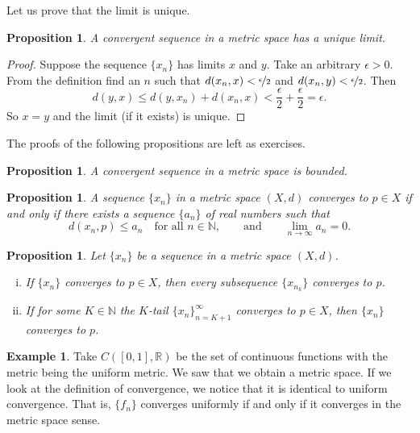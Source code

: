 \documentclass[12pt,openany]{book}
\newcommand{\R}{{\mathbb{R}}}
\newcommand{\N}{{\mathbb{N}}}
\theoremstyle{plain}
\newtheorem{prop}[thm]{Proposition}
\theoremstyle{remark}
\theoremstyle{definition}
\theoremstyle{exercise}
\theoremstyle{example}
\newtheorem{example}[thm]{Example}
\begin{document}
Let us prove that the limit is unique.  

\begin{prop} \label{prop:mslimisunique}
A convergent sequence in a metric space has a unique limit.
\end{prop}

\begin{proof}
Suppose the sequence $\{ x_n \}$ has limits $x$ and $y$.
Take an arbitrary $\epsilon > 0$.
From the definition find an $n$ such that 
$d(x_n,x) < \nicefrac{\epsilon}{2}$ and
$d(x_n,y) < \nicefrac{\epsilon}{2}$.  Then
\begin{equation*}
d(y,x)
\leq
d(y,x_n) + d(x_n,x)
<
\frac{\epsilon}{2} + \frac{\epsilon}{2} = \epsilon .
\end{equation*}
So $x=y$ and the limit (if it exists) is unique.
\end{proof}

The proofs of the following propositions are left as exercises.

\begin{prop} \label{prop:msconvbound}
A convergent sequence in a metric space is bounded.
\end{prop}

\begin{prop} \label{prop:msconvifa}
A sequence $\{ x_n \}$ in a metric space $(X,d)$ converges to $p \in X$
if and only
if there exists a sequence $\{ a_n \}$ of real numbers such that
\begin{equation*}
d(x_n,p) \leq a_n \quad \text{for all } n \in \N,
\qquad \text{and} \qquad
\lim_{n\to\infty} a_n = 0.
\end{equation*}
\end{prop}

\begin{prop} \label{prop:mssubseq}
Let $\{ x_n \}$ be a sequence in a metric space $(X,d)$.
\begin{enumerate}[(i)]
\item If $\{ x_n \}$ converges to $p \in X$, then every subsequence $\{ x_{n_k} \}$
converges to $p$.
\item If for some $K \in \N$ the $K$-tail $\{ x_n \}_{n=K+1}^\infty$
converges to $p \in X$, then
 $\{ x_n \}$ converges to $p$.
\end{enumerate}
\end{prop}

\begin{example}
Take $C([0,1],\R)$ be the set of continuous functions with the metric being
the uniform metric.  We saw that we obtain a metric space.
If we look at the definition of convergence, we notice that it is identical
to uniform convergence.  That is, $\{ f_n \}$ converges uniformly if and only
if it converges in the metric space sense.
\end{example}
\end{document}
